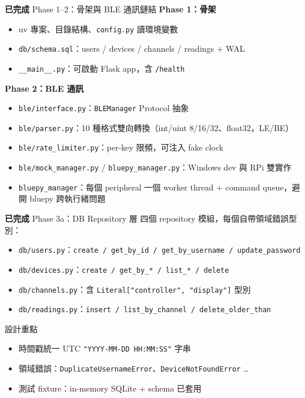 \documentclass[10pt,aspectratio=169]{beamer}
\newcommand{\dn}[1]{\textcolor{done}{\textbf{#1}}}
\begin{document}
\begin{frame}{\dn{已完成} Phase 1–2：骨架與 BLE 通訊鏈結}
  \textbf{Phase 1：骨架}
  \begin{itemize}
    \item uv 專案、目錄結構、\texttt{config.py} 讀環境變數
    \item \texttt{db/schema.sql}：users / devices / channels / readings + WAL
    \item \texttt{\_\_main\_\_.py}：可啟動 Flask app，含 \texttt{/health}
  \end{itemize}

  \vspace{0.5em}
  \textbf{Phase 2：BLE 通訊}
  \begin{itemize}
    \item \texttt{ble/interface.py}：\texttt{BLEManager} Protocol 抽象
    \item \texttt{ble/parser.py}：10 種格式雙向轉換（int/uint 8/16/32、float32，LE/BE）
    \item \texttt{ble/rate\_limiter.py}：per-key 限頻，可注入 fake clock
    \item \texttt{ble/mock\_manager.py} / \texttt{bluepy\_manager.py}：Windows dev 與 RPi 雙實作
    \item \texttt{bluepy\_manager}：每個 peripheral 一個 worker thread + command queue，避開 bluepy 跨執行緒問題
  \end{itemize}
\end{frame}

\begin{frame}{\dn{已完成} Phase 3a：DB Repository 層}
  四個 repository 模組，每個自帶領域錯誤型別：
  \begin{itemize}
    \item \texttt{db/users.py}：\texttt{create / get\_by\_id / get\_by\_username / update\_password}
    \item \texttt{db/devices.py}：\texttt{create / get\_by\_*  / list\_* / delete}
    \item \texttt{db/channels.py}：含 \texttt{Literal["controller", "display"]} 型別
    \item \texttt{db/readings.py}：\texttt{insert / list\_by\_channel / delete\_older\_than}
  \end{itemize}

  \vspace{0.5em}
  \begin{block}{設計重點}
    \begin{itemize}
      \item 時間戳統一 UTC \texttt{"YYYY-MM-DD HH:MM:SS"} 字串
      \item 領域錯誤：\texttt{DuplicateUsernameError}、\texttt{DeviceNotFoundError} …
      \item 測試 fixture：in-memory SQLite + schema 已套用
    \end{itemize}
  \end{block}
\end{frame}
\end{document}
